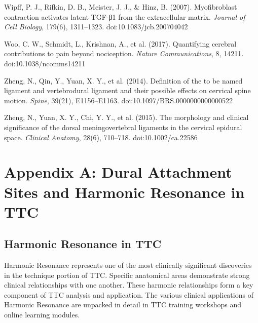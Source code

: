 \documentclass[11pt,letterpaper]{article}
\begin{document}
Wipff, P. J., Rifkin, D. B., Meister, J. J., \& Hinz, B. (2007). Myofibroblast contraction activates latent TGF-β1 from the extracellular matrix. \textit{Journal of Cell Biology}, 179(6), 1311–1323. doi:10.1083/jcb.200704042


Woo, C. W., Schmidt, L., Krishnan, A., et al. (2017). Quantifying cerebral contributions to pain beyond nociception. \textit{Nature Communications}, 8, 14211. doi:10.1038/ncomms14211


Zheng, N., Qin, Y., Yuan, X. Y., et al. (2014). Definition of the to be named ligament and vertebrodural ligament and their possible effects on cervical spine motion. \textit{Spine}, 39(21), E1156–E1163. doi:10.1097/BRS.0000000000000522


Zheng, N., Yuan, X. Y., Chi, Y. Y., et al. (2015). The morphology and clinical significance of the dorsal meningovertebral ligaments in the cervical epidural space. \textit{Clinical Anatomy}, 28(6), 710–718. doi:10.1002/ca.22586


\section{Appendix A: Dural Attachment Sites and Harmonic Resonance in TTC}



\subsection{Harmonic Resonance in TTC}

Harmonic Resonance represents one of the most clinically significant discoveries in the technique portion of TTC. Specific anatomical areas demonstrate strong clinical relationships with one another. These harmonic relationships form a key component of TTC analysis and application. The various clinical applications of Harmonic Resonance are unpacked in detail in TTC training workshops and online learning modules.
\end{document}

